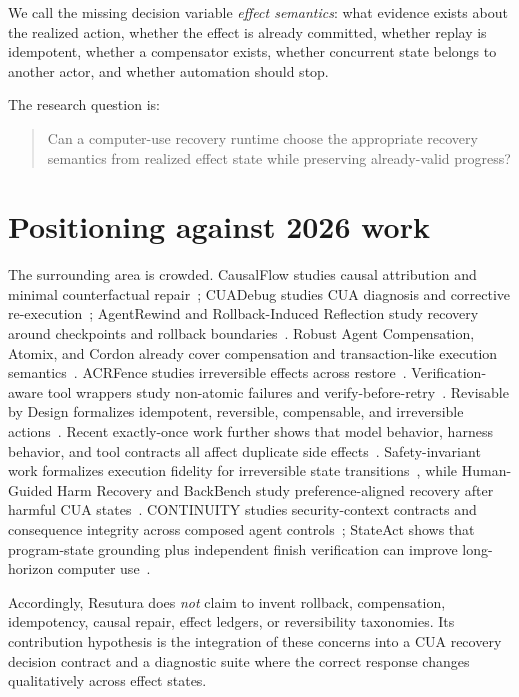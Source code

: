 \documentclass[10pt]{article}
\begin{document}
We call the missing decision variable \emph{effect semantics}: what evidence exists about the realized action, whether the effect is already committed, whether replay is idempotent, whether a compensator exists, whether concurrent state belongs to another actor, and whether automation should stop.

The research question is:

\begin{quote}
Can a computer-use recovery runtime choose the appropriate recovery semantics from realized effect state while preserving already-valid progress?
\end{quote}

\section{Positioning against 2026 work}
The surrounding area is crowded. CausalFlow studies causal attribution and minimal counterfactual repair~\cite{causalflow}; CUADebug studies CUA diagnosis and corrective re-execution~\cite{cuadebug}; AgentRewind and Rollback-Induced Reflection study recovery around checkpoints and rollback boundaries~\cite{agentrewind,rir}. Robust Agent Compensation, Atomix, and Cordon already cover compensation and transaction-like execution semantics~\cite{rac,atomix,cordon}. ACRFence studies irreversible effects across restore~\cite{acrfence}. Verification-aware tool wrappers study non-atomic failures and verify-before-retry~\cite{verified}. Revisable by Design formalizes idempotent, reversible, compensable, and irreversible actions~\cite{revisable}. Recent exactly-once work further shows that model behavior, harness behavior, and tool contracts all affect duplicate side effects~\cite{limbo}. Safety-invariant work formalizes execution fidelity for irreversible state transitions~\cite{safetyinvariants}, while Human-Guided Harm Recovery and BackBench study preference-aligned recovery after harmful CUA states~\cite{harmrecovery}. CONTINUITY studies security-context contracts and consequence integrity across composed agent controls~\cite{continuity}; StateAct shows that program-state grounding plus independent finish verification can improve long-horizon computer use~\cite{stateact}.

Accordingly, Resutura does \emph{not} claim to invent rollback, compensation, idempotency, causal repair, effect ledgers, or reversibility taxonomies. Its contribution hypothesis is the integration of these concerns into a CUA recovery decision contract and a diagnostic suite where the correct response changes qualitatively across effect states.
\end{document}
